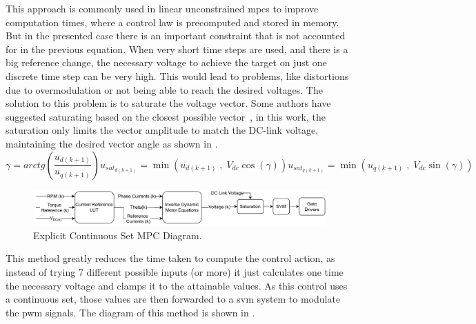 This approach is commonly used in linear unconstrained \gls{mpc}s to improve computation times, where a control law is precomputed and stored in memory. But in the presented case there is an important constraint that is not accounted for in the previous equation. When very short time steps are used, and there is a big reference change, the necessary voltage to achieve the target on just one discrete time step can be very high. This would lead to problems, like distortions due to overmodulation or not being able to reach the desired voltages. The solution to this problem is to saturate the voltage vector. Some authors have suggested saturating based on the closest possible vector~\cite{Fernando:fast_predictive:2013}, in this work, the saturation only limits the vector amplitude to match the DC-link voltage, maintaining the desired vector angle as shown in .
\begin{subequations}
	\begin{equation}
			\gamma = arctg\left(\frac{u_{d(k+1)}}{u_{q(k+1)}}\right)
	\end{equation}
	\begin{equation}
		u_{sat_{d(k+1)}} = \min\left(u_{d(k+1)}\;,\; V_{dc}\cos(\gamma)\right)
	\end{equation}
	\begin{equation}
		u_{sat_{q(k+1)}} = \min\left(u_{q(k+1)}\;,\; V_{dc}\sin(\gamma)\right)
	\end{equation}
	\label{eq:Vdq_saturation}
\end{subequations}

\begin{figure}[!htb]
	\centering
	\includegraphics[width=1\textwidth]{Figures/Explicit_CSMPC.pdf}
	\caption[Explicit Continuous Set MPC Diagram.]{Explicit Continuous Set MPC Diagram.}
	\label{fig:explicit_csmpc_diagram}%
\end{figure}

This method greatly reduces the time taken to compute the control action, as instead of trying 7 different possible inputs (or more) it just calculates one time the necessary voltage and clamps it to the attainable values. As this control uses a continuous set, those values are then forwarded to a \gls{svm} system to modulate the \gls{pwm} signals. The diagram of this method is shown in .


